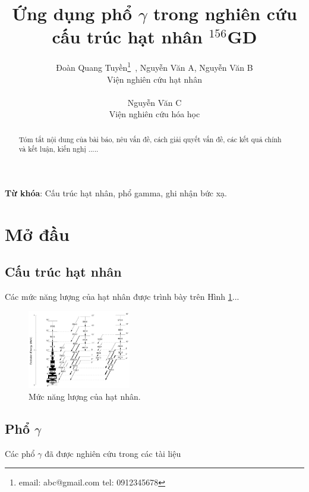 \documentclass[12pt, a4paper]{article}
\begin{document}
\title{Ứng dụng phổ $\gamma$ trong nghiên cứu cấu trúc hạt nhân $^{156}$GD}

\author{Đoàn Quang Tuyền\thanks{email: abc@gmail.com \newline tel: 0912345678}~, Nguyễn Văn A, Nguyễn Văn B\\
Viện nghiên cứu hạt nhân\\
\\
Nguyễn Văn C\\
Viện nghiên cứu hóa học}
\date{\relax}

\maketitle

\begin{abstract}
Tóm tắt nội dung của bài báo, nêu vấn đề, cách giải quyết vấn đề, các kết quả chính và kết luận, kiến nghị ..... 
\end{abstract}

\textbf{Từ khóa}: Cấu trúc hạt nhân, phổ gamma, ghi nhận bức xạ.


\section{Mở đầu}
\subsection{Cấu trúc hạt nhân}
Các mức năng lượng của hạt nhân được trình bày trên Hình \ref{fig:nangluong}...

\begin{figure}[!htb]
\centering
	\includegraphics[width=0.4\textwidth]{156Gd.png}
	\caption{Mức năng lượng của hạt nhân.}
\label{fig:nangluong}
\end{figure}


\subsection{Phổ $\gamma$}
Các phổ $\gamma$ đã được nghiên cứu trong các tài liệu \cite{bib_Bazzaco, bib_Simpson}
\end{document}
